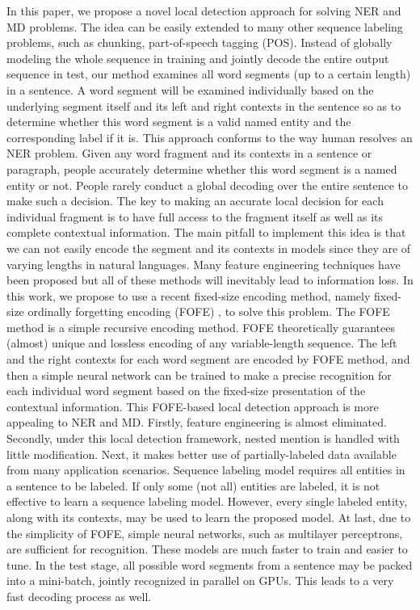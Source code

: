 \documentclass[11pt,a4paper]{article}
\begin{document}
In this paper, we propose a novel local detection approach for solving NER and MD problems. The idea can be easily extended to many other sequence labeling problems, such as chunking, part-of-speech tagging (POS). Instead of globally modeling the whole sequence in training and jointly decode the entire output sequence in test, 
our method examines all word segments (up to a certain length) in a sentence. A word segment will be examined individually based on the underlying segment itself and its left and right contexts in the sentence so as to determine whether this word segment is a valid named entity and the corresponding label if it is. 
This approach conforms to the way human resolves an NER problem. Given any word fragment and its contexts in a sentence or paragraph, people accurately determine whether this word segment is a named entity or not. People rarely conduct a global decoding over the entire sentence to make such a decision. 
The key to making an accurate local decision for each individual fragment is to have full access to the fragment itself as well as its complete contextual information. 
The main pitfall to implement this idea is that we can not easily encode the segment and its contexts in models since they are of varying lengths in natural languages. Many feature engineering techniques have been proposed but all of these methods will inevitably lead to information loss. 
In this work, we propose to use a recent fixed-size encoding method, namely fixed-size ordinally forgetting encoding (FOFE) \cite{zhang2015fixed}, to solve this problem.  The FOFE method is a simple recursive encoding method. FOFE theoretically guarantees (almost) unique and lossless encoding of any variable-length sequence. The left and the right contexts for each word segment are encoded by FOFE method, and then a simple neural network can be trained to make a precise recognition for each individual word segment based on the fixed-size presentation of the contextual information. This FOFE-based local detection approach is more appealing to NER and MD. Firstly, feature engineering is almost eliminated. 
Secondly, under this local detection framework, nested mention is handled with little modification. Next, it makes better use of partially-labeled data available from many application scenarios. Sequence labeling model requires all entities in a sentence to be labeled. If only some (not all) entities are labeled, it is not effective to learn a sequence labeling model. However, every single labeled entity, along with its contexts, may be used to learn the proposed model. At last, due to the simplicity of FOFE, simple neural networks, such as multilayer perceptrons, are sufficient for recognition. These models are much faster to train and easier to tune. In the test stage, all possible word segments from a sentence may be packed into a mini-batch, jointly recognized in parallel on GPUs. This leads to a very fast decoding process as well.
\end{document}
